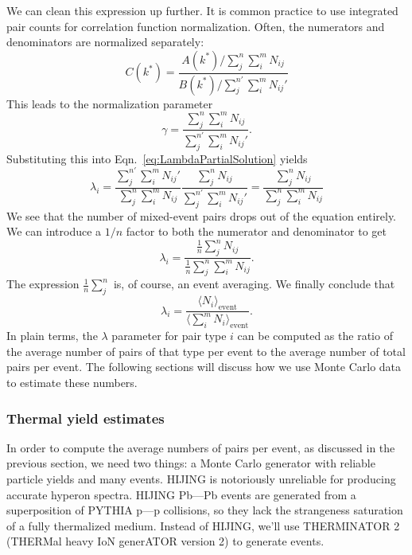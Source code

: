 We can clean this expression up further.  It is common practice to use integrated pair counts for correlation function normalization. Often, the numerators and denominators are normalized separately:
\begin{equation}
C(k^*) = \frac{A(k^*)/\sum_j^n \sum_i^m N_{ij}}{B(k^*)/\sum_j^{n'} \sum_i^m N_{ij}'}
\end{equation}
This leads to the normalization parameter
\begin{equation}
\gamma = \frac{\sum_j^n \sum_i^m N_{ij}}{\sum_j^{n'} \sum_i^m N_{ij}'}.
\end{equation}
Substituting this into Eqn.\ \ref{eq:LambdaPartialSolution} yields 
\begin{equation}
\lambda_i = \frac{\sum_j^{n'} \sum_i^m N_{ij}'} {\sum_j^n \sum_i^m N_{ij}} \frac{\sum_j^n N_{ij} }{\sum_j^{n'} \sum_i^m N_{ij}'} = \frac{\sum_j^n N_{ij} }{\sum_j^n \sum_i^m N_{ij}}
\end{equation}
We see that the number of mixed-event pairs drops out of the equation entirely. We can introduce a $1/n$ factor to both the numerator and denominator to get
\begin{equation}
\lambda_i = \frac{\frac{1}{n}\sum_j^n N_{ij} }{\frac{1}{n}\sum_j^n \sum_i^m N_{ij}}.
\end{equation}
The expression $\frac{1}{n} \sum_j^n$ is, of course, an event averaging. We finally conclude that
\begin{equation}
\label{eq:LambdaParSolution}
\lambda_i = \frac{\langle N_{i}\rangle_{\mathrm{event}}} {\langle\sum_i^m N_{i}\rangle_{\mathrm{event}}}.
\end{equation}
In plain terms, the $\lambda$ parameter for pair type $i$ can be computed as the ratio of the average number of pairs of that type per event to the average number of total pairs per event. 
The following sections will discuss how we use Monte Carlo data to estimate these numbers.

\subsubsection{Thermal yield estimates}
\label{sec:ThermalYields}


In order to compute the average numbers of pairs per event, as discussed in the previous section, we need two things: a Monte Carlo generator with reliable particle yields and many events. 
HIJING is notoriously unreliable for producing accurate hyperon spectra.  
HIJING Pb---Pb events are generated from a superposition of PYTHIA p---p collisions, so they lack the strangeness saturation of a fully thermalized medium.  
Instead of HIJING, we'll use THERMINATOR 2 (THERMal heavy IoN generATOR version 2)  \cite{Chojnacki:2011hb} to generate events.

